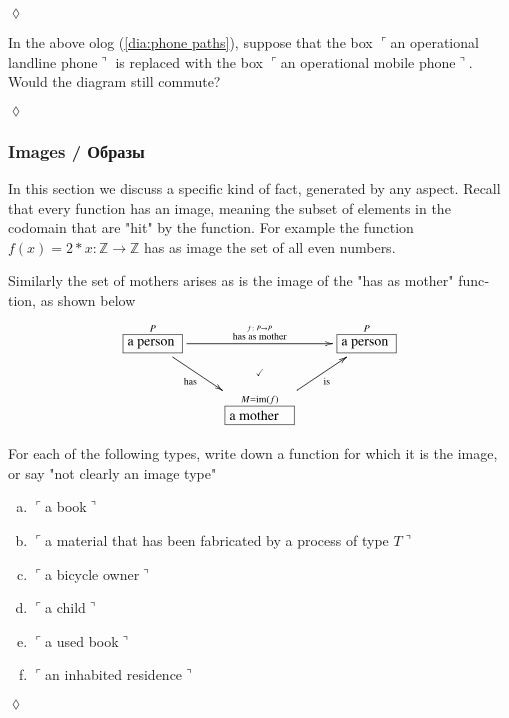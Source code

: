 \documentclass{book}
\def\tn{\textnormal}
\def\ZZ{{\mathbb Z}}
\def\im{\tn{im}}
\def\to{\rightarrow}
\def\taking{\colon}
\newcommand{\LA}[2]{\ar[#1]^-{\tn {#2}}}
\newcommand{\LAL}[2]{\ar[#1]_-{\tn {#2}}}
\newcommand{\obox}[3]{\stackrel{#1}{\fbox{\parbox{#2}{#3}}}}
\newcommand{\fakebox}[1]{\tn{$\ulcorner$#1$\urcorner$}}
\theoremstyle{theoremENG}
\theoremstyle{lemmaENG}
\theoremstyle{propositionENG}
\theoremstyle{corollaryENG}
\theoremstyle{factENG}
\theoremstyle{remarkENG}
\theoremstyle{exampleENG}
\theoremstyle{warningENG}
\theoremstyle{questionENG}
\theoremstyle{guessENG}
\theoremstyle{answerENG}
\theoremstyle{constructionENG}
\theoremstyle{rulesENG}
\theoremstyle{excENG}
\newtheorem{excENG}[subsubsection]{\begin{english}Exercise\end{english}}
\theoremstyle{appENG}
\theoremstyle{definitionENG}
\theoremstyle{notationENG}
\theoremstyle{conjectureENG}
\theoremstyle{postulateENG}
\newenvironment{exerciseENG}{\begin{excENG}}{\hspace*{\fill}$\lozenge$\end{excENG}}
\theoremstyle{theoremRUS}
\theoremstyle{lemmaRUS}
\theoremstyle{propositionRUS}
\theoremstyle{corollaryRUS}
\theoremstyle{factRUS}
\theoremstyle{remarkRUS}
\theoremstyle{exampleRUS}
\theoremstyle{warningRUS}
\theoremstyle{questionRUS}
\theoremstyle{guessRUS}
\theoremstyle{answerRUS}
\theoremstyle{constructionRUS}
\theoremstyle{rulesRUS}
\theoremstyle{excRUS}
\theoremstyle{appRUS}
\theoremstyle{definitionRUS}
\theoremstyle{notationRUS}
\theoremstyle{conjectureRUS}
\theoremstyle{postulateRUS}
\def\sexc{\begin{enumerate}[a.)]\setlength{\itemsep}{.1cm}\setlength{\parskip}{.1cm}\item}
\def\next{\item}
\def\endsexc{\end{enumerate}}
\begin{document}
\begin{english}
\begin{exerciseENG}
\end{exerciseENG}

\begin{exerciseENG}

In the above olog (\ref{dia:phone paths}), suppose that the box \fakebox{an operational landline phone} is replaced with the box \fakebox{an operational mobile phone}. Would the diagram still commute?

\begin{russian} \end{russian}

\end{exerciseENG}


\subsubsection{Images / Образы}\label{sec:images}

In this section we discuss a specific kind of fact, generated by any aspect. Recall that every function has an image, meaning the subset of elements in the codomain that are "hit" by the function. For example the function $f(x)=2*x\taking \ZZ\to\ZZ$ has as image the set of all even numbers.

\begin{russian} \end{russian}

Similarly the set of mothers arises as is the image of the "has as mother" function, as shown below 
$$
\xymatrix{\obox{P}{.5in}{a person}\LAL{rd}{has}\LA{rr}{$\stackrel{f\taking P\to P}{\tn{has as mother}}$}&&\obox{P}{.5in}{a person}\\
&\obox{M=\im(f)}{.6in}{a mother}\LAL{ur}{is}\ar@{}[u]|(.6){\checkmark}
}$$

\begin{russian} \end{russian}

\begin{exerciseENG}

For each of the following types, write down a function for which it is the image, or say "not clearly an image type" 
\sexc \fakebox{a book}
\next \fakebox{a material that has been fabricated by a process of type $T$}
\next \fakebox{a bicycle owner}
\next \fakebox{a child}
\next \fakebox{a used book}
\next \fakebox{an inhabited residence}
\endsexc

\begin{russian} \end{russian}


\end{exerciseENG}
\end{english}
\end{document}
